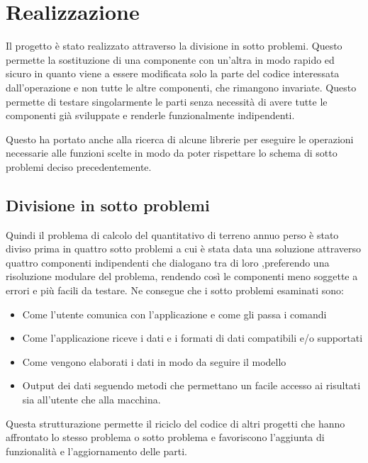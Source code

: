 
\chapter{Realizzazione}
\label{cap:realizzazione}

Il progetto è stato realizzato attraverso la divisione in sotto problemi. Questo permette la sostituzione di una componente con un'altra in modo rapido ed sicuro in quanto viene a essere modificata solo la parte del codice interessata dall'operazione e non tutte le altre componenti, che rimangono invariate. Questo permette di testare singolarmente le parti senza necessità di avere tutte le componenti già sviluppate e renderle funzionalmente indipendenti.

Questo ha portato anche alla ricerca di alcune librerie per eseguire le operazioni necessarie alle funzioni scelte in modo da poter rispettare lo schema di sotto problemi deciso precedentemente.

\section{Divisione in sotto problemi}
Quindi il problema di calcolo del quantitativo di terreno annuo perso è stato diviso prima in quattro sotto problemi a cui è stata data una soluzione attraverso quattro componenti indipendenti che dialogano tra di loro ,preferendo una risoluzione modulare del problema, rendendo così le componenti meno soggette a errori e più facili da testare.
Ne consegue che i sotto problemi esaminati sono:
\begin{itemize}
\item Come l'utente comunica con l'applicazione e come gli passa i comandi
\item Come l'applicazione riceve i dati e i formati di dati compatibili e/o supportati
\item Come vengono elaborati i dati in modo da seguire il modello \rusle
\item Output dei dati seguendo metodi che permettano un facile accesso ai risultati sia all'utente che alla macchina.
\end{itemize}

Questa strutturazione permette il riciclo del codice di altri progetti che hanno affrontato lo stesso problema o sotto problema e favoriscono l'aggiunta di funzionalità e l'aggiornamento delle parti. 

